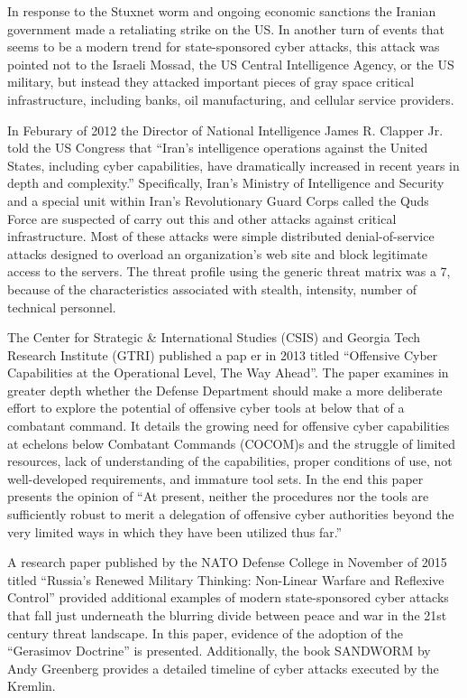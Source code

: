 \documentclass[12pt]{report}
\begin{document}
In response to the Stuxnet worm and ongoing economic sanctions the Iranian government made a retaliating strike on the US.  In another turn of events that seems to be a modern trend for state-sponsored cyber attacks, this attack was pointed not to the Israeli Mossad, the US Central Intelligence Agency, or the US military, but instead they attacked important pieces of gray space critical infrastructure, including banks, oil manufacturing, and cellular service providers.  

In Feburary of 2012 the Director of National Intelligence James R. Clapper Jr. told the US Congress that “Iran’s intelligence operations against the United States, including cyber capabilities, have dramatically increased in recent years in depth and complexity.”  Specifically, Iran’s Ministry of Intelligence and Security and a special unit within Iran’s Revolutionary Guard Corps called the Quds Force are suspected of carry out this and other attacks against critical infrastructure.  Most of these attacks were simple distributed denial-of-service attacks designed to overload an organization’s web site and block legitimate access to the servers.  The threat profile using the generic threat matrix was a 7, because of the characteristics associated with stealth, intensity, number of technical personnel.

The Center for Strategic \& International Studies (CSIS) and Georgia Tech Research Institute (GTRI) published a pap er in 2013 titled “Offensive Cyber Capabilities at the Operational Level, The Way Ahead”.  The paper examines in greater depth whether the Defense Department should make a more deliberate effort to explore the potential of offensive cyber tools at below that of a combatant command.  It details the growing need for offensive cyber capabilities at echelons below Combatant Commands (COCOM)s and the struggle of limited resources, lack of understanding of the capabilities, proper conditions of use, not well-developed requirements, and immature tool sets.  In the end this paper presents the opinion of “At present, neither the procedures nor the tools are sufficiently robust to merit a delegation of offensive cyber authorities beyond the very limited ways in which they have been utilized thus far.”  \cite{nakashima2012iran}

A research paper published by the NATO Defense College in November of 2015 titled “Russia’s Renewed Military Thinking: Non-Linear Warfare and Reflexive Control” provided additional examples of modern state-sponsored cyber attacks that fall just underneath the blurring divide between peace and war in the 21st century threat landscape.  In this paper, evidence of the adoption of the “Gerasimov Doctrine” is presented.  Additionally, the book SANDWORM by Andy Greenberg provides a detailed timeline of cyber attacks executed by the Kremlin.
\end{document}
